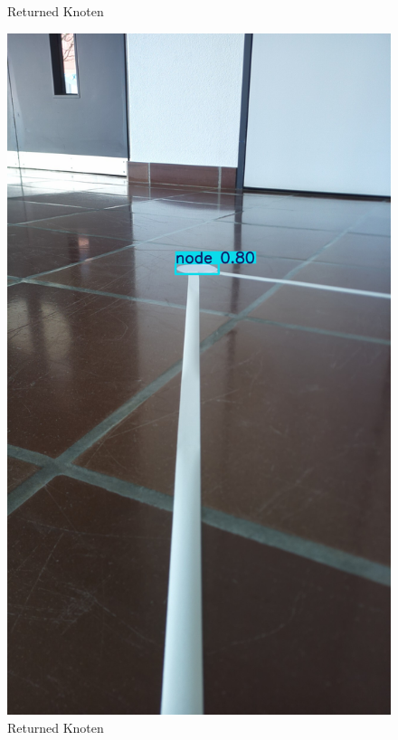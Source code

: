 \begin{figure}[H]
\begin{minipage}[b]{0.23\textwidth}
    \caption{Returned Knoten}
    \label{fig:expl-algo-1}
  \end{minipage}
  \hfill
  \begin{minipage}[b]{0.23\textwidth}
    \centering
    \includegraphics[width=\textwidth]{assets/IT/testing/yolo/node_annot.png}
    \caption{Returned Knoten}
    \label{fig:expl-algo-2}
  \end{minipage}
    \hfill
  \begin{minipage}[b]{0.23\textwidth}
    \centering

\end{minipage}
\end{figure}

